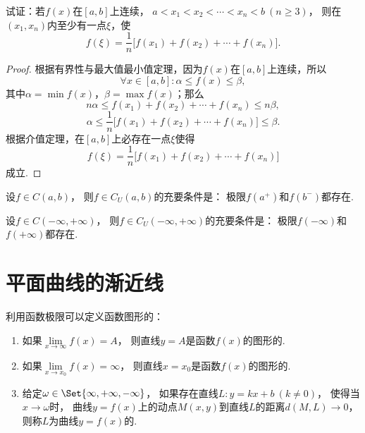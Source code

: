\begin{example}
试证：若\(f(x)\)在\([a,b]\)上连续，
\(a < x_1 < x_2 < \dotsb < x_n < b \ (n \geq 3)\)，
则在\((x_1,x_n)\)内至少有一点\(\xi\)，使\[
f(\xi) = \frac{1}{n} \bigl[
	f(x_1) + f(x_2) + \dotsb + f(x_n)
\bigr].
\]
\begin{proof}
根据有界性与最大值最小值定理，因为\(f(x)\)在\([a,b]\)上连续，所以\[
\forall x \in [a,b] :
	\alpha \leq f(x) \leq \beta,
\]其中\(\alpha = \min f(x)\)，\(\beta = \max f(x)\)；那么\[
n \alpha \leq f(x_1) + f(x_2) + \dotsb + f(x_n) \leq n \beta,
\]\[
\alpha \leq \frac{1}{n} \bigl[f(x_1) + f(x_2) + \dotsb + f(x_n)\bigr] \leq \beta.
\]根据介值定理，在\([a,b]\)上必存在一点\(\xi\)使得\[
f(\xi) = \frac{1}{n} \bigl[ f(x_1) + f(x_2) + \dotsb + f(x_n) \bigr]
\]成立.
\end{proof}
\end{example}

\begin{theorem}\label{theorem:极限.闭区间上连续函数的性质.开区间上的连续函数一致连续的充要条件1}
设\(f \in C(a,b)\)，
则\(f \in C_U(a,b)\)的充要条件是：
极限\(f(a^+)\)和\(f(b^-)\)都存在.
\end{theorem}

\begin{theorem}\label{theorem:极限.闭区间上连续函数的性质.开区间上的连续函数一致连续的充要条件2}
设\(f \in C(-\infty,+\infty)\)，
则\(f \in C_U(-\infty,+\infty)\)的充要条件是：
极限\(f(-\infty)\)和\(f(+\infty)\)都存在.
\end{theorem}

\section{平面曲线的渐近线}
\begin{definition}
利用函数极限可以定义函数图形的：
\begin{enumerate}
	\item 如果\(\lim\limits_{x \to \infty}f(x) = A\)，
	则直线\(y = A\)是函数\(f(x)\)的图形的.
	\item 如果\(\lim\limits_{x \to x_0}f(x) = \infty\)，
	则直线\(x = x_0\)是函数\(f(x)\)的图形的.
	\item 给定\(\omega\in\Set{\infty,+\infty,-\infty}\)，
	如果存在直线\(L: y = kx+b\ (k \neq 0)\)，
	使得当\(x\to\omega\)时，
	曲线\(y = f(x)\)上的动点\(M(x,y)\)到直线\(L\)的距离\(d(M,L)\to0\)，
	则称\(L\)为曲线\(y = f(x)\)的.
\end{enumerate}
\end{definition}

